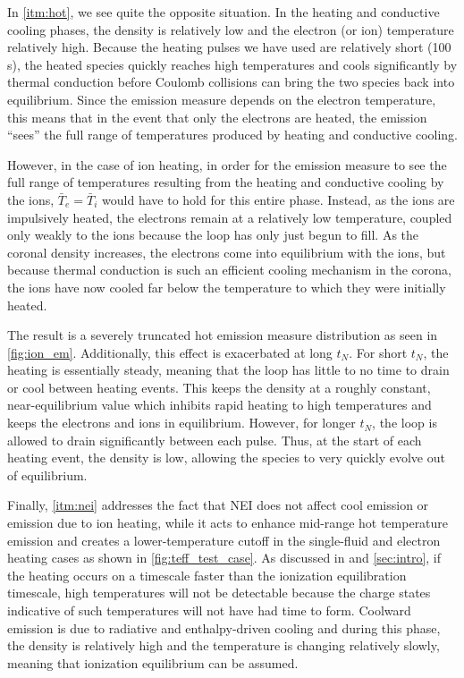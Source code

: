 \documentclass[apj]{emulateapj}
\begin{document}
	\par In \autoref{itm:hot}, we see quite the opposite situation. In the heating and conductive cooling phases, the density is relatively low and the electron (or ion) temperature relatively high. Because the heating pulses we have used are relatively short (100 s), the heated species quickly reaches high temperatures and cools significantly by thermal conduction before Coulomb collisions can bring the two species back into equilibrium. Since the emission measure depends on the electron temperature, this means that in the event that only the electrons are heated, the emission  ``sees'' the full range of temperatures produced by heating and conductive cooling.
	\par However, in the case of ion heating, in order for the emission measure to see the full range of temperatures resulting from the heating and conductive cooling by the ions, $\bar{T}_e=\bar{T}_i$ would have to hold for this entire phase. Instead, as the ions are impulsively heated, the electrons remain at a relatively low temperature, coupled only weakly to the ions because the loop has only just begun to fill. As the coronal density increases, the electrons come into equilibrium with the ions, but because thermal conduction is such an efficient cooling mechanism in the corona, the ions have now cooled far below the temperature to which they were initially heated. 
	\par The result is a severely truncated hot emission measure distribution as seen in \autoref{fig:ion_em}. Additionally, this effect is exacerbated at long $t_N$. For short $t_N$, the heating is essentially steady, meaning that the loop has little to no time to drain or cool between heating events. This keeps the density at a roughly constant, near-equilibrium value which inhibits rapid heating to high temperatures and keeps the electrons and ions in equilibrium. However, for longer $t_N$, the loop is allowed to drain significantly between each pulse. Thus, at the start of each heating event, the density is low, allowing the species to very quickly evolve out of equilibrium. 
	\par Finally, \autoref{itm:nei} addresses the fact that NEI does not affect cool emission or emission due to ion heating, while it acts to enhance mid-range hot temperature emission and creates a lower-temperature cutoff in the single-fluid and electron heating cases as shown in \autoref{fig:teff_test_case}. As discussed in  and \autoref{sec:intro}, if the heating occurs on a timescale faster than the ionization equilibration timescale, high temperatures will not be detectable because the charge states indicative of such temperatures will not have had time to form. Coolward emission is due to radiative and enthalpy-driven cooling and during this phase, the density is relatively high and the temperature is changing relatively slowly, meaning that ionization equilibrium can be assumed. 
\end{document}
